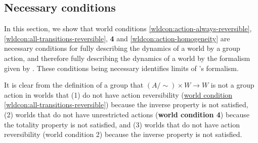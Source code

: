 \subsection{Necessary conditions}

In this section, we show that world conditions \ref{wldcon:action-always-reversible}, \ref{wldcon:all-transitions-reversible}, \textbf{4} and \ref{wldcon:action-homogeneity} are necessary conditions for fully describing the dynamics of a world by a group action, and therefore fully describing the dynamics of a world by the formalism given by \cite{Higgins2018}.
These conditions being necessary identifies limits of \cite{Higgins2018}'s formalism.

It is clear from the definition of a group that $(A/\sim) \times W \to W$ is not a group action in worlds that (1) do not have action reversibility (\hyperref[wldcon:all-transitions-reversible]{world condition \ref*{wldcon:all-transitions-reversible}}) because the inverse property is not satisfied, (2) worlds that do not have unrestricted actions (\textbf{world condition 4}) because the totality property is not satisfied, and (3) worlds that do not have action reversibility (world condition 2) because the inverse property is not satisfied.


